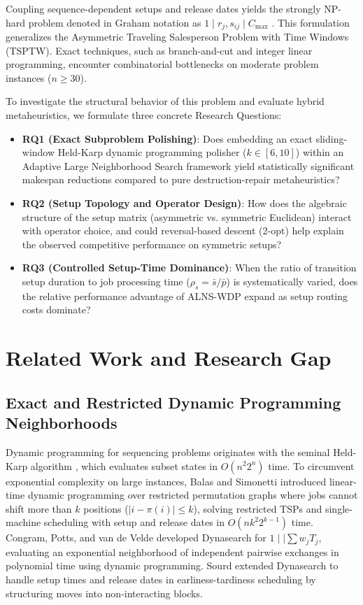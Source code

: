 \documentclass[journal]{IEEEtran}
\begin{document}
Coupling sequence-dependent setups and release dates yields the strongly NP-hard problem denoted in Graham notation as $1 \mid r_j, s_{ij} \mid C_{\max}$ \cite{graham1979optimization, allahverdi2015third}. This formulation generalizes the Asymmetric Traveling Salesperson Problem with Time Windows (TSPTW). Exact techniques, such as branch-and-cut and integer linear programming, encounter combinatorial bottlenecks on moderate problem instances ($n \ge 30$).

To investigate the structural behavior of this problem and evaluate hybrid metaheuristics, we formulate three concrete Research Questions:
\begin{itemize}
    \item \textbf{RQ1 (Exact Subproblem Polishing)}: Does embedding an exact sliding-window Held-Karp dynamic programming polisher ($k \in [6, 10]$) within an Adaptive Large Neighborhood Search framework yield statistically significant makespan reductions compared to pure destruction-repair metaheuristics?
    \item \textbf{RQ2 (Setup Topology and Operator Design)}: How does the algebraic structure of the setup matrix (asymmetric vs. symmetric Euclidean) interact with operator choice, and could reversal-based descent (2-opt) help explain the observed competitive performance on symmetric setups?
    \item \textbf{RQ3 (Controlled Setup-Time Dominance)}: When the ratio of transition setup duration to job processing time ($\rho_s = \bar{s}/\bar{p}$) is systematically varied, does the relative performance advantage of ALNS-WDP expand as setup routing costs dominate?
\end{itemize}

\section{Related Work and Research Gap}
\label{sec:related_work}

\subsection{Exact and Restricted Dynamic Programming Neighborhoods}
Dynamic programming for sequencing problems originates with the seminal Held-Karp algorithm \cite{held1962dynamic}, which evaluates subset states in $O(n^2 2^n)$ time. To circumvent exponential complexity on large instances, Balas and Simonetti \cite{balas2001linear} introduced linear-time dynamic programming over restricted permutation graphs where jobs cannot shift more than $k$ positions ($|i - \pi(i)| \le k$), solving restricted TSPs and single-machine scheduling with setup and release dates in $O(n k^2 2^{k-1})$ time. Congram, Potts, and van de Velde \cite{congram2002iterated} developed Dynasearch for $1 \mid\mid \sum w_j T_j$, evaluating an exponential neighborhood of independent pairwise exchanges in polynomial time using dynamic programming. Sourd \cite{sourd2006dynasearch} extended Dynasearch to handle setup times and release dates in earliness-tardiness scheduling by structuring moves into non-interacting blocks.
\end{document}
